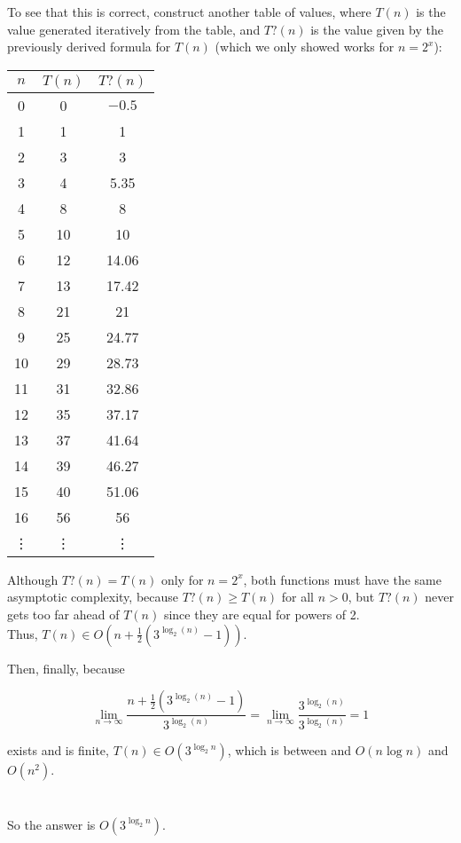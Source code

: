 \documentclass[a4paper]{article}
\begin{document}
To see that this is correct, construct another table of values, where $T(n)$ is the value generated iteratively from the table, and $T?(n)$ is the value given by the previously derived formula for $T(n)$ (which we only showed works for $n=2^x$):
\begin{center}
\begin{tabular}{ c  | c | c }
$n$ & $T(n)$ & $T?(n)$\\
\hline
0&0&$-0.5$\\
1&1&1\\
2&3&3\\
3&4&5.35\\
4&8&8\\
5&10&10\\
6&12&14.06\\
7&13&17.42\\
8&21&21\\
9&25&24.77\\
10&29&28.73\\
11&31&32.86\\
12&35&37.17\\
13&37&41.64\\
14&39&46.27\\
15&40&51.06\\
16&56&56\\
\vdots&\vdots&\vdots\\
\end{tabular}
\end{center}

Although $T?(n)=T(n)$ only for $n=2^x$, both functions must have the same asymptotic complexity, because $T?(n)\geq T(n)$ for all $n>0$, but $T?(n)$ never gets too far ahead of $T(n)$ since they are equal for powers of 2.
\\Thus, $T(n)\in O(n+\frac{1}{2}(3^{\log_2(n)}-1))$.

Then, finally, because

$$\lim_{n\to\infty}\frac{n+\frac{1}{2}(3^{\log_2(n)}-1)}{3^{\log_2(n)}}=\lim_{n\to\infty}\frac{3^{\log_2(n)}}{3^{\log_2(n)}}=1$$

exists and is finite, $T(n)\in O(3^{\log_2 n})$, which is between and $O(n \log n)$ and $O(n^2)$.\\


\\\\So the answer is $O(3^{\log_2 n})$.
\end{document}
